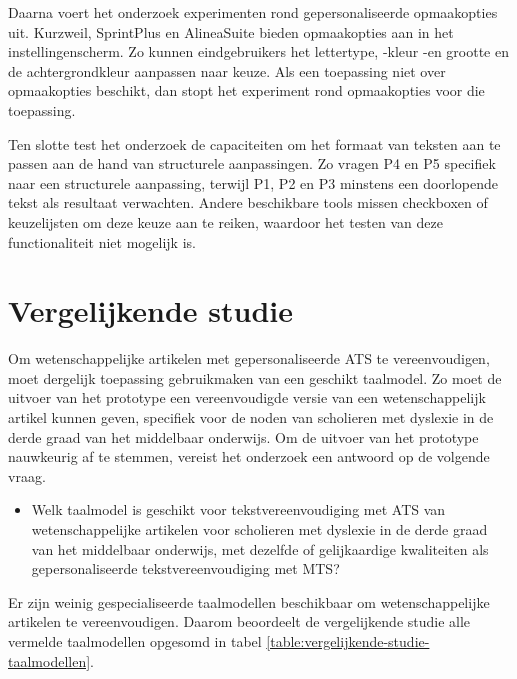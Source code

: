 \medspace

Daarna voert het onderzoek experimenten rond gepersonaliseerde opmaakopties uit. Kurzweil, SprintPlus en AlineaSuite bieden opmaakopties aan in het instellingenscherm. Zo kunnen eindgebruikers het lettertype, -kleur -en grootte en de achtergrondkleur aanpassen naar keuze. Als een toepassing niet over opmaakopties beschikt, dan stopt het experiment rond opmaakopties voor die toepassing.

\medspace

Ten slotte test het onderzoek de capaciteiten om het formaat van teksten aan te passen aan de hand van structurele aanpassingen. Zo vragen P4 en P5 specifiek naar een structurele aanpassing, terwijl P1, P2 en P3 minstens een doorlopende tekst als resultaat verwachten. Andere beschikbare tools missen checkboxen of keuzelijsten om deze keuze aan te reiken, waardoor het testen van deze functionaliteit niet mogelijk is.

\section{Vergelijkende studie}
\label{sec:vergelijkende-studie}

Om wetenschappelijke artikelen met gepersonaliseerde ATS te vereenvoudigen, moet dergelijk toepassing gebruikmaken van een geschikt taalmodel. Zo moet de uitvoer van het prototype een vereenvoudigde versie van een wetenschappelijk artikel kunnen geven, specifiek voor de noden van scholieren met dyslexie in de derde graad van het middelbaar onderwijs. Om de uitvoer van het prototype nauwkeurig af te stemmen, vereist het onderzoek een antwoord op de volgende vraag.

\begin{itemize}
	\item Welk taalmodel is geschikt voor tekstvereenvoudiging met ATS van wetenschappelijke artikelen voor scholieren met dyslexie in de derde graad van het middelbaar onderwijs, met dezelfde of gelijkaardige kwaliteiten als gepersonaliseerde tekstvereenvoudiging met MTS?
\end{itemize}

Er zijn weinig gespecialiseerde taalmodellen beschikbaar om wetenschappelijke artikelen te vereenvoudigen. Daarom beoordeelt de vergelijkende studie alle vermelde taalmodellen opgesomd in tabel \ref{table:vergelijkende-studie-taalmodellen}.

